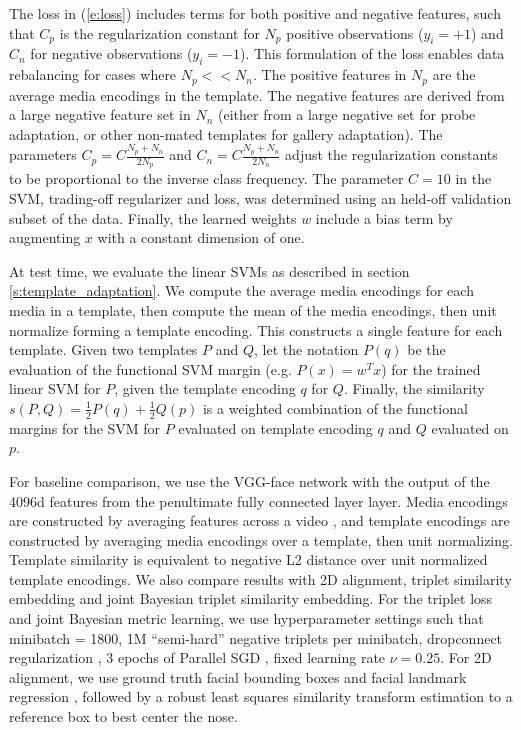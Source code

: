 \documentclass[10pt,twocolumn,letterpaper]{article}
\theoremstyle{definition}		\newtheorem{defn}[thm]{Definition}
\begin{document}
The loss in (\ref{e:loss}) includes terms for both positive and negative features, such that $C_p$ is the regularization constant for $N_p$ positive observations ($y_i = +1$) and $C_n$ for negative observations ($y_i=-1$).  This formulation of the loss enables data rebalancing for cases where $N_p << N_n$.  The positive features in $N_p$ are the average media encodings in the template.  The negative features are derived from a large negative feature set in $N_n$ (either from a large negative set for probe adaptation, or other non-mated templates for gallery adaptation).  The parameters $C_p=C\frac{N_p+N_n}{2N_p}$ and $C_n=C\frac{N_p+N_n}{2N_n}$ adjust the regularization constants to be proportional to the inverse class frequency.  The parameter $C=10$ in the SVM, trading-off regularizer and loss, was determined using an held-off validation subset of the data.  Finally, the learned weights $w$ include a bias term by augmenting $x$ with a constant dimension of one. 

At test time, we evaluate the linear SVMs as described in section \ref{s:template_adaptation}.  We compute the average media encodings for each media in a template, then compute the mean of the media encodings, then unit normalize forming a template encoding. This constructs a single feature for each template.  Given two templates $P$ and $Q$, let the notation $P(q)$ be the evaluation of the functional SVM margin (e.g. $P(x)=w^Tx$) for the trained linear SVM for $P$, given the template encoding $q$ for $Q$.  Finally, the similarity $s(P,Q)=\frac{1}{2}P(q) + \frac{1}{2}Q(p)$ is a weighted combination of the functional margins for the SVM for $P$ evaluated on template encoding $q$ and $Q$ evaluated on $p$.


For baseline comparison, we use the VGG-face network with the output of the 4096d features from the penultimate fully connected layer layer.  Media encodings are constructed by averaging features across a video \cite{Parkhi14,Parkhi15}, and template encodings are constructed by averaging media encodings over a template, then unit normalizing.  Template similarity is equivalent to negative L2 distance over unit normalized template encodings.  We also compare results with 2D alignment, triplet similarity embedding and joint Bayesian triplet similarity embedding.  For the triplet loss and joint Bayesian metric learning, we use hyperparameter settings such that minibatch = 1800, 1M “semi-hard” \cite{Schroff15} negative triplets per minibatch, dropconnect regularization \cite{Wan13}, 3 epochs of Parallel SGD \cite{Zinkevich11}, fixed learning rate $\nu=0.25$.  For 2D alignment, we use ground truth facial bounding boxes and facial landmark regression \cite{Kazemi14}, followed by a robust least squares similarity transform estimation to a reference box to best center the nose.  
\end{document}
